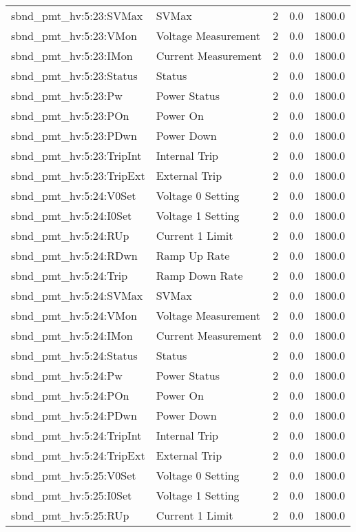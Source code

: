 \begin{center}
\begin{longtable}{l | l l l l }
sbnd\_pmt\_hv:5:23:SVMax & SVMax & 2 & 0.0 & 1800.0\\ 
sbnd\_pmt\_hv:5:23:VMon & Voltage Measurement & 2 & 0.0 & 1800.0\\ 
sbnd\_pmt\_hv:5:23:IMon & Current Measurement & 2 & 0.0 & 1800.0\\ 
sbnd\_pmt\_hv:5:23:Status & Status & 2 & 0.0 & 1800.0\\ 
sbnd\_pmt\_hv:5:23:Pw & Power Status & 2 & 0.0 & 1800.0\\ 
sbnd\_pmt\_hv:5:23:POn & Power On & 2 & 0.0 & 1800.0\\ 
sbnd\_pmt\_hv:5:23:PDwn & Power Down & 2 & 0.0 & 1800.0\\ 
sbnd\_pmt\_hv:5:23:TripInt & Internal Trip & 2 & 0.0 & 1800.0\\ 
sbnd\_pmt\_hv:5:23:TripExt & External Trip & 2 & 0.0 & 1800.0\\ 
sbnd\_pmt\_hv:5:24:V0Set & Voltage 0 Setting & 2 & 0.0 & 1800.0\\ 
sbnd\_pmt\_hv:5:24:I0Set & Voltage 1 Setting & 2 & 0.0 & 1800.0\\ 
sbnd\_pmt\_hv:5:24:RUp & Current 1 Limit & 2 & 0.0 & 1800.0\\ 
sbnd\_pmt\_hv:5:24:RDwn & Ramp Up Rate & 2 & 0.0 & 1800.0\\ 
sbnd\_pmt\_hv:5:24:Trip & Ramp Down Rate & 2 & 0.0 & 1800.0\\ 
sbnd\_pmt\_hv:5:24:SVMax & SVMax & 2 & 0.0 & 1800.0\\ 
sbnd\_pmt\_hv:5:24:VMon & Voltage Measurement & 2 & 0.0 & 1800.0\\ 
sbnd\_pmt\_hv:5:24:IMon & Current Measurement & 2 & 0.0 & 1800.0\\ 
sbnd\_pmt\_hv:5:24:Status & Status & 2 & 0.0 & 1800.0\\ 
sbnd\_pmt\_hv:5:24:Pw & Power Status & 2 & 0.0 & 1800.0\\ 
sbnd\_pmt\_hv:5:24:POn & Power On & 2 & 0.0 & 1800.0\\ 
sbnd\_pmt\_hv:5:24:PDwn & Power Down & 2 & 0.0 & 1800.0\\ 
sbnd\_pmt\_hv:5:24:TripInt & Internal Trip & 2 & 0.0 & 1800.0\\ 
sbnd\_pmt\_hv:5:24:TripExt & External Trip & 2 & 0.0 & 1800.0\\ 
sbnd\_pmt\_hv:5:25:V0Set & Voltage 0 Setting & 2 & 0.0 & 1800.0\\ 
sbnd\_pmt\_hv:5:25:I0Set & Voltage 1 Setting & 2 & 0.0 & 1800.0\\ 
sbnd\_pmt\_hv:5:25:RUp & Current 1 Limit & 2 & 0.0 & 1800.0\\ 

\end{longtable}
\end{center}

